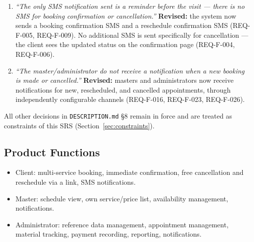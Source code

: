 \documentclass[11pt,a4paper]{article}
\begin{document}
\begin{enumerate}[leftmargin=1.2cm]
  \item \emph{``The only SMS notification sent is a reminder before the
    visit --- there is no SMS for booking confirmation or cancellation.''}
    \textbf{Revised:} the system now sends a booking confirmation SMS and a
    reschedule confirmation SMS (REQ-F-005, REQ-F-009). No additional SMS is
    sent specifically for cancellation --- the client sees the updated
    status on the confirmation page (REQ-F-004, REQ-F-006).
  \item \emph{``The master/administrator do not receive a notification when
    a new booking is made or cancelled.''}
    \textbf{Revised:} masters and administrators now receive notifications
    for new, rescheduled, and cancelled appointments, through independently
    configurable channels (REQ-F-016, REQ-F-023, REQ-F-026).
\end{enumerate}
All other decisions in \texttt{DESCRIPTION.md} \S8 remain in force and are
treated as constraints of this SRS (Section~\ref{sec:constraints}).

\subsection{Product Functions}
\begin{itemize}[leftmargin=1.2cm]
  \item Client: multi-service booking, immediate confirmation, free
    cancellation and reschedule via a link, SMS notifications.
  \item Master: schedule view, own service/price list, availability
    management, notifications.
  \item Administrator: reference data management, appointment management,
    material tracking, payment recording, reporting, notifications.
\end{itemize}
\end{document}
